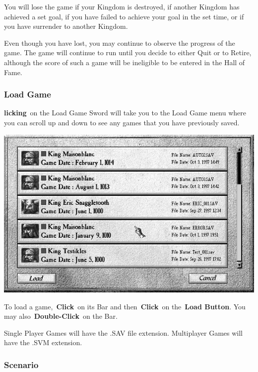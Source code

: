 You will lose the game if your Kingdom is destroyed, if another Kingdom has achieved a set goal, if you have failed to achieve your goal in the set time, or if you have surrender to another Kingdom.

Even though you have lost, you may continue to observe the progress of the game. The game will continue to run until you decide to either Quit or to Retire, although the score of such a game will be ineligible to be entered in the Hall of Fame.

\subsubsection{Load Game}


\textbf{licking} on the Load Game Sword will take you to the Load Game menu where you can scroll up and down to see any games that you have previously saved.

\begin{center}
	\includegraphics[width=0.9\linewidth]{Iload}
\end{center}

To load a game, \textbf{Click} on its Bar and then \textbf{Click} on the \textbf{Load Button}. You may also \textbf{Double-Click} on the Bar.

Single Player Games will have the .SAV file extension. Multiplayer Games will have the .SVM extension.

\subsubsection{Scenario}


